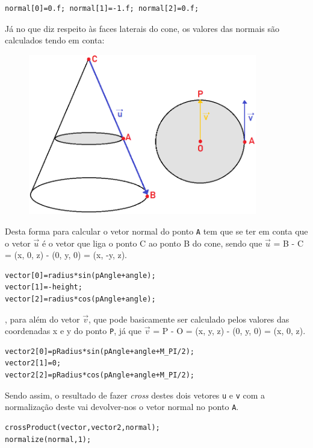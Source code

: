 \documentclass{article}
\begin{document}
\begin{verbatim}
normal[0]=0.f; normal[1]=-1.f; normal[2]=0.f;
\end{verbatim}

Já no que diz respeito às faces laterais do cone, os valores das normais são calculados tendo em conta:

\begin{figure}[H]
    \centering
    \includegraphics[height=7cm]{normal_cone.png} 
\end{figure}

Desta forma para calcular o vetor normal do ponto \texttt{A} tem que se ter em conta que o vetor $\overrightarrow{u}$ é o vetor que liga o ponto C ao ponto B do cone, sendo que $\overrightarrow{u}$ = B - C = (x, 0, z) - (0, y, 0) = (x, -y, z).

\begin{verbatim}
vector[0]=radius*sin(pAngle+angle);
vector[1]=-height;
vector[2]=radius*cos(pAngle+angle);
\end{verbatim}

, para além do vetor $\overrightarrow{v}$, que pode basicamente ser calculado pelos valores das coordenadas x e y do ponto \texttt{P}, já que $\overrightarrow{v}$ = P - O = (x, y, z) - (0, y, 0) = (x, 0, z).\\

\begin{verbatim}
vector2[0]=pRadius*sin(pAngle+angle+M_PI/2);
vector2[1]=0;
vector2[2]=pRadius*cos(pAngle+angle+M_PI/2);
\end{verbatim}

Sendo assim, o resultado de fazer \textit{cross} destes dois vetores \texttt{u} e \texttt{v} com a normalização deste vai devolver-nos o vetor normal no ponto \texttt{A}.

\begin{verbatim}
crossProduct(vector,vector2,normal);
normalize(normal,1);
\end{verbatim}
\end{document}
